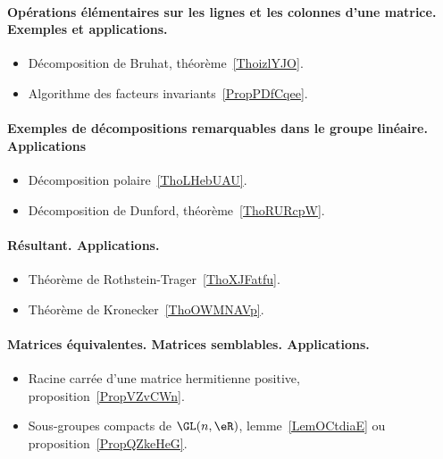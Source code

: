 \paragraph{Opérations élémentaires sur les lignes et les colonnes d’une matrice. Exemples et applications.}
\begin{itemize}
	\item Décomposition de Bruhat, théorème~\ref{ThoizlYJO}.
	\item Algorithme des facteurs invariants~\ref{PropPDfCqee}.
\end{itemize}

\paragraph{Exemples de décompositions remarquables dans le groupe linéaire. Applications}
\begin{itemize}
	\item Décomposition polaire~\ref{ThoLHebUAU}.
	\item Décomposition de Dunford, théorème~\ref{ThoRURcpW}.
\end{itemize}
\paragraph{Résultant. Applications.}
\begin{itemize}
	\item Théorème de Rothstein-Trager~\ref{ThoXJFatfu}.
	\item Théorème de Kronecker~\ref{ThoOWMNAVp}.
\end{itemize}
\paragraph{Matrices équivalentes. Matrices semblables. Applications.}
\begin{itemize}
	\item Racine carrée d'une matrice hermitienne positive, proposition~\ref{PropVZvCWn}.
	\item Sous-groupes compacts de \( \GL(n,\eR)\), lemme~\ref{LemOCtdiaE} ou proposition~\ref{PropQZkeHeG}.
\end{itemize}
